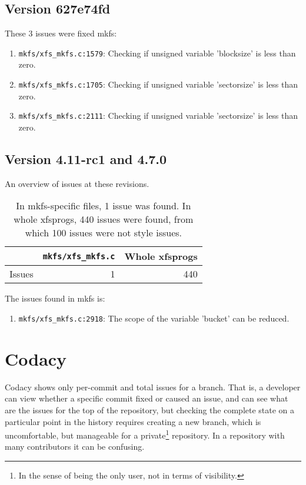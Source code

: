 \subsection{Version 627e74fd}
These 3 issues were fixed mkfs:
\begin{enumerate}
	\item {\tt mkfs/xfs\_mkfs.c:1579}: Checking if unsigned variable 'blocksize' is less than zero.
	\item {\tt mkfs/xfs\_mkfs.c:1705}: Checking if unsigned variable
		'sectorsize' is less than zero.
	\item {\tt mkfs/xfs\_mkfs.c:2111}: Checking if unsigned variable
		'sectorsize' is less than zero.
\end{enumerate}

\subsection{Version 4.11-rc1 and 4.7.0}
An overview of issues at these revisions.
\begin{table}[h]
\begin{tabular}{|l||r||r|}
\hline
& {\tt mkfs/xfs\_mkfs.c} & Whole xfsprogs \\
\hline
Issues & 1 & 440 \\
\hline
\end{tabular}
\caption{In mkfs-specific files, 1 issue was found. In whole xfsprogs, 440
issues were found, from which 100 issues were not style issues.}
\end{table}

The issues found in mkfs is:
\begin{enumerate}
	\item {\tt mkfs/xfs\_mkfs.c:2918}: The scope of the variable 'bucket' can be reduced.
\end{enumerate}



\section{Codacy}\label{chap:results:codacy}
Codacy shows only per-commit and total issues for a branch. That is, a
developer can view whether a specific commit fixed or caused an issue, and
can see what are the issues for the top of the repository, but checking the
complete state on a particular point in the history requires creating a new
branch, which is uncomfortable, but manageable for a private\footnote{In
the sense of being the only user, not in terms of visibility.} repository.
In a repository with many contributors it can be confusing.


